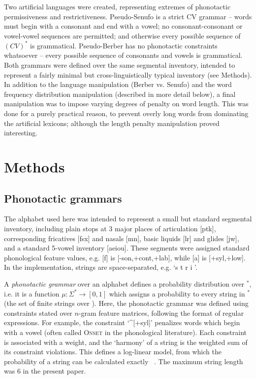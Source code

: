 \documentclass[11pt]{article}
\begin{document}
Two artificial languages were created, representing extremes of phonotactic permissiveness and restrictiveness. Pseudo-Senufo is a strict CV grammar -- words must begin with a consonant and end with a vowel; no consonant-consonant or vowel-vowel sequences are permitted; and otherwise every possible sequence of $(CV)^*$ is grammatical. Pseudo-Berber has no phonotactic constraints whatsoever -- every possible sequence of consonants and vowels is grammatical. Both grammars were defined over the same segmental inventory, intended to represent a fairly minimal but cross-linguistically typical inventory (see Methods). In addition to the language manipulation (Berber vs. Senufo) and the word frequency distribution manipulation (described in more detail below), a final manipulation was to impose varying degrees of penalty on word length. This was done for a purely practical reason, to prevent overly long words from dominating the artificial lexicons; although the length penalty manipulation proved interesting.

\section{Methods}

\subsection{Phonotactic grammars}

The alphabet \Sigma used here was intended to represent a small but standard segmental inventory, including plain stops at 3 major places of articulation [ptk], corresponding fricatives [fsx] and nasals [mn\engma], basic liquids [lr] and glides [jw], and a standard 5-vowel inventory [aeiou]. These segments were assigned standard phonological feature values, e.g. [f] is [-son,+cont,+lab], while [a] is [+syl,+low]. In the implementation, strings are space-separated, e.g. `s t r i \engma'.

A \textit{phonotactic grammar} \mu over an alphabet \Sigma defines a probability distribution over \Sigma$^*$, i.e. it is a function $\mu : \Sigma^* \rightarrow [0,1]$ which assigns a probability to every string in \Sigma$^*$ (the set of finite strings over \Sigma). Here, the phonotactic grammar was defined using constraints stated over $n$-gram feature matrices, following the format of regular expressions. For example, the constraint `^[+syl]' penalizes words which begin with a vowel (often called \textsc{Onset} in the phonological literature). Each constraint is associated with a weight, and the `harmony' of a string is the weighted sum of its constraint violations. This defines a log-linear model, from which the probability of a string can be calculated exactly ~\cite{Hayes08a}. The maximum string length was 6 in the present paper.
\end{document}
